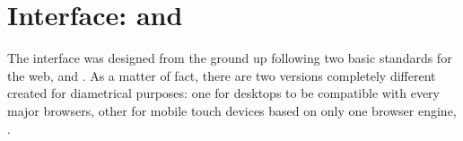 \section{Interface:  and } %
\label{sec:htmlcss}

The  interface was designed from the ground up following two basic standards for the web,  and .
As a matter of fact, there are two versions completely different created for diametrical purposes: one for desktops to be compatible with every major browsers, other for mobile touch devices based on only one browser engine, .






